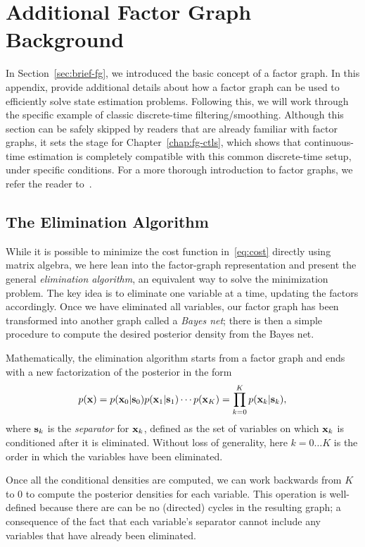 \chapter{Additional Factor Graph Background}\label{app:add-fg-bg}

In Section~\ref{sec:brief-fg}, we introduced the basic concept of a factor graph. In this appendix, provide additional details about how a factor graph can be used to efficiently solve state estimation problems. Following this, we will work through the specific example of classic discrete-time filtering/smoothing. Although this section can be safely skipped by readers that are already familiar with factor graphs, it sets the stage for Chapter~\ref{chap:fg-ctls}, which shows that continuous-time estimation is completely compatible with this common discrete-time setup, under specific conditions.  For a more thorough introduction to factor graphs, we refer the reader to~\citet{dellaertFactorGraphsRobot2017}.

\section{The Elimination Algorithm}\label{sec:elim-algo}

While it is possible to minimize the cost function in~\eqref{eq:cost} directly using matrix algebra, we here lean into the factor-graph representation and present the general {\em elimination algorithm}, an equivalent way to solve the minimization problem.  The key idea is to eliminate one variable at a time, updating the factors accordingly.  Once we have eliminated all variables, our factor graph has been transformed into another graph called a {\em Bayes net}; there is then a simple procedure to compute the desired posterior density from the Bayes net.

Mathematically, the elimination algorithm starts from a factor graph and ends with a new factorization of the posterior in the form
\begin{equation}\label{eq:elimfactors}
p(\mathbf{x}) = p(\mathbf{x}_0 | \mathbf{s}_0) p(\mathbf{x}_1 | \mathbf{s}_1) \cdots p(\mathbf{x}_K) = \prod_{k=0}^K p(\mathbf{x}_k | \mathbf{s}_k),
\end{equation}
where $\mathbf{s}_k$ is the {\em separator} for $\mathbf{x}_k$, defined as the set of variables on which $\mathbf{x}_k$ is conditioned after it is eliminated.  
Without loss of generality, here $k=0\ldots K$ is the order in which the variables have been eliminated. 

Once all the conditional densities are computed, we can work backwards from $K$ to $0$ to compute the posterior densities for each variable.  This operation is well-defined because there are can be no (directed) cycles in the resulting graph; a consequence of the fact that each variable's separator cannot include any variables that have already been eliminated.

